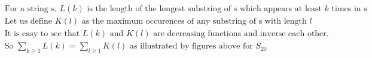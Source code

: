 \documentclass[10pt,a4paper]{letter}
\begin{document}
\begin{align*}
	&\text{For a string s, } L(k) \text { is the length of the longest substring of s which appears at least }k\text{ times in s}\\
	&\text{Let us define }  K(l) \text { as the maximum occurences of any  substring of s with length }l\\
	&\text{It is easy to see that }L(k)\text{ and }K(l)\text{ are decreasing functions and inverse each other.}\\
	&\text{So }\sum_{k\geqslant 1} L(k) = \sum_{l\geqslant 1} K(l)\text{ as illustrated by figures above for }S_{20}	
\end{align*}
\end{document}

